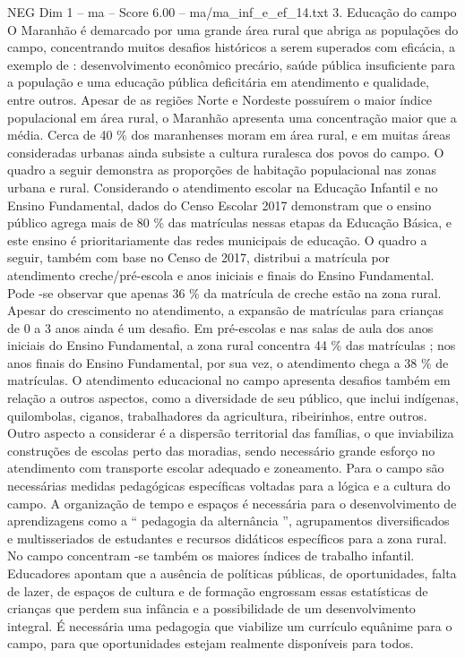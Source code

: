 \begin{textsample}{NEG Dim 1 – ma – Score 6.00 – ma/ma\_inf\_e\_ef\_14.txt}  \label{ex:f1_neg_226}
3.
Educação do campo O Maranhão é demarcado por uma grande área rural que abriga as populações do campo, concentrando muitos desafios históricos a serem superados com eficácia, a exemplo de : desenvolvimento econômico precário, saúde pública insuficiente para a população e uma educação pública deficitária em atendimento e qualidade, entre outros.
Apesar de as regiões Norte e Nordeste possuírem o maior índice populacional em área rural, o Maranhão apresenta uma concentração maior que a média.
Cerca de 40 \% dos maranhenses moram em área rural, e em muitas áreas consideradas urbanas ainda subsiste a cultura ruralesca dos povos do campo.
O quadro a seguir demonstra as proporções de habitação populacional nas zonas urbana e rural.
Considerando o atendimento escolar na Educação Infantil e no Ensino Fundamental, dados do Censo Escolar 2017 demonstram que o ensino público agrega mais de 80 \% das matrículas nessas etapas da Educação Básica, e este ensino é prioritariamente das redes municipais de educação.
O quadro a seguir, também com base no Censo de 2017, distribui a matrícula por atendimento creche/pré-escola e anos iniciais e finais do Ensino Fundamental.
Pode -se observar que apenas 36 \% da matrícula de creche estão na zona rural.
Apesar do crescimento no atendimento, a expansão de matrículas para crianças de 0 a 3 anos ainda é um desafio.
Em pré-escolas e nas salas de aula dos anos iniciais do Ensino Fundamental, a zona rural concentra 44 \% das matrículas ; nos anos finais do Ensino Fundamental, por sua vez, o atendimento chega a 38 \% de matrículas.
O atendimento educacional no campo apresenta desafios também em relação a outros aspectos, como a diversidade de seu público, que inclui indígenas, quilombolas, ciganos, trabalhadores da agricultura, ribeirinhos, entre outros.
Outro aspecto a considerar é a dispersão territorial das famílias, o que inviabiliza construções de escolas perto das moradias, sendo necessário grande esforço no atendimento com transporte escolar adequado e zoneamento.
Para o campo são necessárias medidas pedagógicas específicas voltadas para a lógica e a cultura do campo.
A organização de tempo e espaços é necessária para o desenvolvimento de aprendizagens como a “ pedagogia da alternância ”, agrupamentos diversificados e multisseriados de estudantes e recursos didáticos específicos para a zona rural.
No campo concentram -se também os maiores índices de trabalho infantil.
Educadores apontam que a ausência de políticas públicas, de oportunidades, falta de lazer, de espaços de cultura e de formação engrossam essas estatísticas de crianças que perdem sua infância e a possibilidade de um desenvolvimento integral.
É necessária uma pedagogia que viabilize um currículo equânime para o campo, para que oportunidades estejam realmente disponíveis para todos.

\end{textsample}
